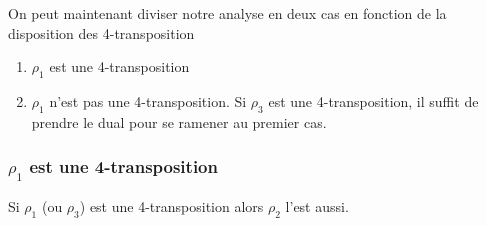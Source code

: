 On peut maintenant diviser notre analyse en deux cas en fonction de la disposition des 4-transposition

\begin{enumerate}
  \item $\rho_1$ est une 4-transposition
  \item $\rho_1$ n'est pas une 4-transposition. Si $\rho_3$ est une 4-transposition, il suffit de prendre le dual pour se ramener au premier cas.
\end{enumerate}

\subsubsection{$\rho_1$ est une 4-transposition}

\begin{theorem}
  Si $\rho_1$ (ou $\rho_3$) est une 4-transposition alors $\rho_2$ l'est aussi.
\end{theorem}

